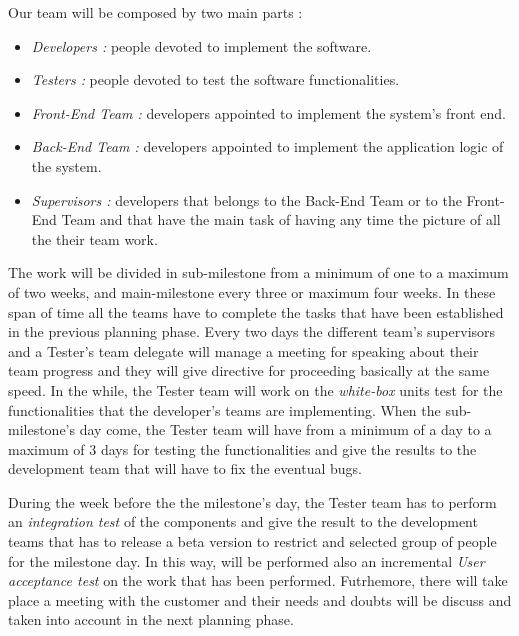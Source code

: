 \newpage
{}
Our team will be composed by two main parts :
\begin{itemize}
	\item \emph{Developers :} people devoted to implement the software.
	
	\item \emph{Testers :} people devoted to test the software functionalities.
	
	\item \emph{Front-End Team :} developers appointed to implement the system’s front end.
	
	
	\item \emph{Back-End Team :} developers appointed to implement the application logic of the system.
	
	\item \emph{Supervisors :} developers that belongs to the Back-End Team or to the Front-End Team and that have the main task of having any time the picture of all the their team work.
\end{itemize}

The work will be divided in sub-milestone from a minimum of one to a maximum of two weeks, and main-milestone every three or maximum four weeks. In these span of time all the teams have to complete the tasks that have been established in the previous planning phase. Every two days the different team's supervisors and a Tester’s team delegate will manage a meeting for speaking about their team progress and they will give directive for proceeding basically at the same speed. 
In the while, the Tester team will work on the \emph{white-box} units test for the functionalities that the developer’s teams are implementing.
When the sub-milestone’s day come, the Tester team will have from a minimum of a day to a maximum of 3 days for testing the functionalities and give the results to the development team that will have to fix the eventual bugs.

During the week before the the milestone’s day, the Tester team has to perform an \emph{integration test} of the components and give the result to the development teams that has to release a beta version to restrict and selected group of people for the milestone day. In this way, will be performed also an incremental \emph{User acceptance test} on the work that has been performed. Futrhemore, there will take place a meeting with the customer and their needs and doubts will be discuss and taken into account in the next planning phase.

